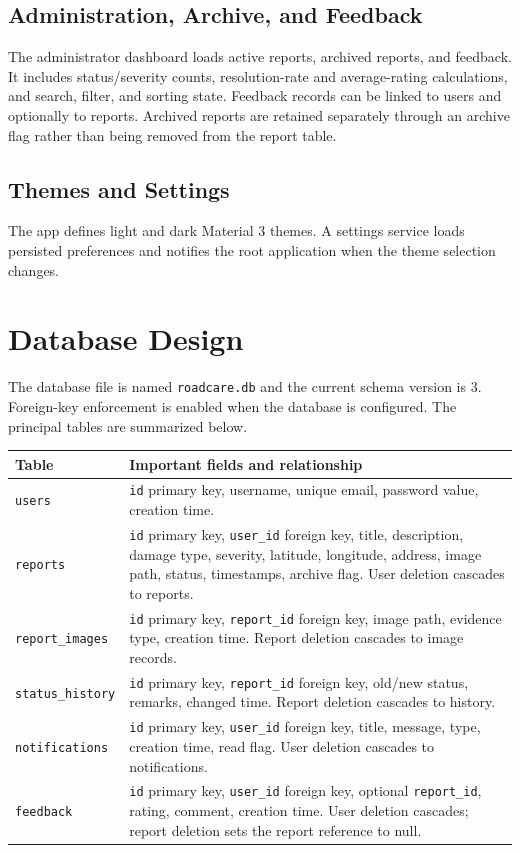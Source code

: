 \documentclass[12pt,a4paper]{report}
\begin{document}
\section{Administration, Archive, and Feedback}
The administrator dashboard loads active reports, archived reports, and feedback. It includes status/severity counts, resolution-rate and average-rating calculations, and search, filter, and sorting state. Feedback records can be linked to users and optionally to reports. Archived reports are retained separately through an archive flag rather than being removed from the report table.

\section{Themes and Settings}
The app defines light and dark Material 3 themes. A settings service loads persisted preferences and notifies the root application when the theme selection changes.

\chapter{Database Design}
The database file is named \texttt{roadcare.db} and the current schema version is 3. Foreign-key enforcement is enabled when the database is configured. The principal tables are summarized below.

\begin{longtable}{p{}p{}}
\toprule
\textbf{Table} & \textbf{Important fields and relationship} \\
\midrule
\texttt{users} & \texttt{id} primary key, username, unique email, password value, creation time. \\
\texttt{reports} & \texttt{id} primary key, \texttt{user\_id} foreign key, title, description, damage type, severity, latitude, longitude, address, image path, status, timestamps, archive flag. User deletion cascades to reports. \\
\texttt{report\_images} & \texttt{id} primary key, \texttt{report\_id} foreign key, image path, evidence type, creation time. Report deletion cascades to image records. \\
\texttt{status\_history} & \texttt{id} primary key, \texttt{report\_id} foreign key, old/new status, remarks, changed time. Report deletion cascades to history. \\
\texttt{notifications} & \texttt{id} primary key, \texttt{user\_id} foreign key, title, message, type, creation time, read flag. User deletion cascades to notifications. \\
\texttt{feedback} & \texttt{id} primary key, \texttt{user\_id} foreign key, optional \texttt{report\_id}, rating, comment, creation time. User deletion cascades; report deletion sets the report reference to null. \\
\bottomrule
\end{longtable}
\end{document}
